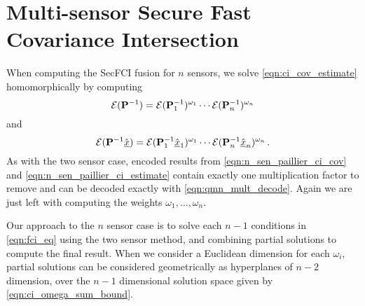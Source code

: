 \documentclass[letterpaper, 10 pt, conference]{ieeeconf}  %
\begin{document}



\section{Multi-sensor Secure Fast Covariance Intersection} \label{sec:multi_secfci}
When computing the SecFCI fusion for $n$ sensors, we solve \eqref{eqn:ci_cov_estimate} homomorphically by computing
\begin{equation}
   \mathcal{E}({{\mathbf{P}}}^{-1}) = \mathcal{E}({{\mathbf{P}}}^{-1}_1)^{\omega_1}\cdots\mathcal{E}({{\mathbf{P}}}^{-1}_n)^{\omega_n} \label{eqn:n_sen_paillier_ci_cov}
\end{equation}
and
\begin{equation}
   \mathcal{E}({{\mathbf{P}}}^{-1}\hat{{\underline{x}}}) = \mathcal{E}({{\mathbf{P}}}^{-1}_1\hat{{\underline{x}}}_1)^{\omega_1}\cdots\mathcal{E}({{\mathbf{P}}}^{-1}_n\hat{{\underline{x}}}_n)^{\omega_n}\,. \label{eqn:n_sen_paillier_ci_estimate}
\end{equation}
As with the two sensor case, encoded results from \eqref{eqn:n_sen_paillier_ci_cov} and \eqref{eqn:n_sen_paillier_ci_estimate} contain exactly one multiplication factor to remove and can be decoded exactly with \eqref{eqn:qmn_mult_decode}. Again we are just left with computing the weights $\omega_1,\dots,\omega_n$.

Our approach to the $n$ sensor case is to solve each $n-1$ conditions in \eqref{eqn:fci_eq} using the two sensor method, and combining partial solutions to compute the final result. When we consider a Euclidean dimension for each $\omega_i$, partial solutions can be considered geometrically as hyperplanes of $n-2$ dimension, over the $n-1$ dimensional solution space given by \eqref{eqn:ci_omega_sum_bound}. 
\end{document}
